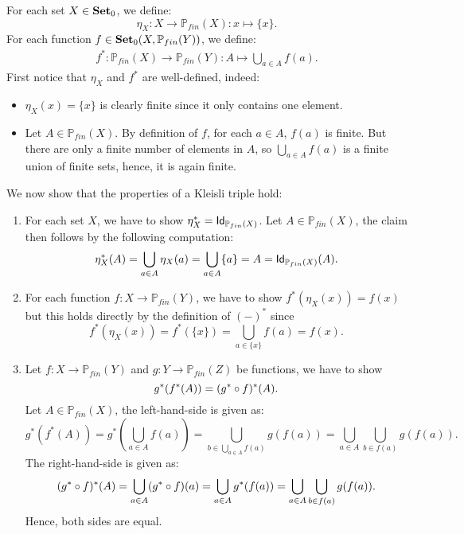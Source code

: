 \begin{solution}
  \label{sol:kleisli_triple_nondeterminism}
For each set $X\in\Ob \SET$, we define:
\[
\eta_X : X \to \mathbb{P}_{fin}(X) : x\mapsto \{x\}.
\]
For each function $f\in\CHom{\Ob \SET}{X}{\mathbb{P}_{fin}(Y)}$, we define:
\begin{align*}
f^{*} : \mathbb{P}_{fin}(X) \to \mathbb{P}_{fin}(Y) : A \mapsto \bigcup_{a\in A} f(a).
\end{align*}
First notice that $\eta_X$ and $f^{*}$ are well-defined, indeed: 
\begin{itemize}
\item $\eta_X(x) = \{x\}$ is clearly finite since it only contains one element.
\item Let $A\in \mathbb{P}_{fin}(X)$. By definition of $f$, for each $a\in A$, $f(a)$ is finite. But there are only a finite number of elements in $A$, so $\bigcup_{a\in A} f(a)$ is a finite union of finite sets, hence, it is again finite.
\end{itemize}
We now show that the properties of a Kleisli triple hold:
\begin{enumerate}
\item For each set $X$, we have to show $\eta_X^{*} = \Id[\mathbb{P}_{fin}(X)]$. Let $A\in \mathbb{P}_{fin}(X)$, the claim then follows by the following computation:
\[
\eta_X^{*}(A) = \bigcup_{a\in A} \eta_X(a) = \bigcup_{a\in A} \{a\} = A = \Id[\mathbb{P}_{fin}(X)](A).
\]

\item For each function $f:X\to \mathbb{P}_{fin}(Y)$, we have to show $f^{*}(\eta_X(x)) = f(x)$ but this holds directly by the definition of $(-)^{*}$ since
\[
f^{*}(\eta_X(x)) = f^{*}(\{x\}) = \bigcup_{a\in \{x\}} f(a) = f(x).
\]

\item Let $f:X\to \mathbb{P}_{fin}(Y)$ and $g:Y\to \mathbb{P}_{fin}(Z)$ be functions, we have to show 
\[
g^{*}(f^{*}(A)) = (\co{f}{g^{*}})^{*}(A).
\] 
Let $A\in \mathbb{P}_{fin}(X)$, the left-hand-side is given as:
\[
g^{*}(f^{*}(A)) = g^{*}\left( \bigcup_{a\in A} f(a) \right) = \bigcup_{b \in \bigcup_{a\in A} f(a)} g(f(a)) = \bigcup_{a\in A} \bigcup_{b\in f(a)} g(f(a)).
\]
The right-hand-side is given as:
\[
(\co{f}{g^{*}})^{*}(A) = \bigcup_{a\in A} (\co{f}{g^{*}})(a) = \bigcup_{a\in A} g^{*}(f(a)) = \bigcup_{a\in A} \bigcup_{b\in f(a)} g(f(a)).
\]
Hence, both sides are equal.

\end{enumerate}
\end{solution}

